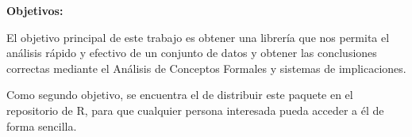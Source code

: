 \textbf{Objetivos:}

El objetivo principal de este trabajo es obtener una librer\'ia que 
nos permita el an\'alisis r\'apido y efectivo de un conjunto de datos 
y obtener las conclusiones correctas mediante el An\'alisis de Conceptos 
Formales y sistemas de implicaciones.

Como segundo objetivo, se encuentra el de distribuir este paquete en el repositorio 
de R, para que cualquier persona interesada pueda acceder a \'el de forma sencilla.
\\
\\


\newpage
\thispagestyle{empty}
\mbox{}

\newpage